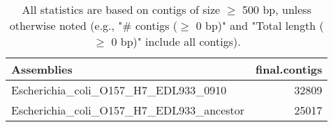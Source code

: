 \documentclass[12pt,a4paper]{article}
\begin{document}
\begin{table}[ht]
\begin{center}
\caption{All statistics are based on contigs of size $\geq$ 500 bp, unless otherwise noted (e.g., "\# contigs ($\geq$ 0 bp)" and "Total length ($\geq$ 0 bp)" include all contigs).}
\begin{tabular}{|l*{1}{|r}|}
\hline
Assemblies & final.contigs \\ \hline
Escherichia\_coli\_O157\_H7\_EDL933\_0910 & 32809 \\ \hline
Escherichia\_coli\_O157\_H7\_EDL933\_ancestor & 25017 \\ \hline
\end{tabular}
\end{center}
\end{table}
\end{document}
